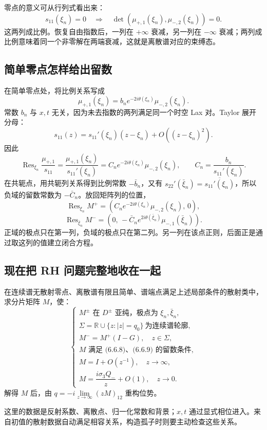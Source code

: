 \documentclass[lang=cn,scheme=chinese,mode=simple,device=normal,color=blue,math=cm,thmcnt=section,12pt]{elegantbook}
\DeclareMathOperator*{\Res}{Res}
\newcommand{\eqq}[2]{\tag{#1}\label{eq:#1}#2}
\begin{document}
零点的意义可从行列式看出来：
\[
s_{11}(\xi_n)=0
\quad\Longrightarrow\quad
\det(\mu_{+,1}(\xi_n),\mu_{-,2}(\xi_n))=0.
\]
这两列成比例。恢复自由指数后，一列在 $+\infty$ 衰减，另一列在 $-\infty$ 衰减；两列成比例意味着同一个非零解在两端衰减，这就是离散谱对应的束缚态。

\subsection*{简单零点怎样给出留数}
在简单零点处，将比例关系写成
\begin{equation}\eqq{6.6.2}{\mu_{+,1}(\xi_n)
=b_ne^{-2i\theta(\xi_n)}\mu_{-,2}(\xi_n).}\end{equation}
常数 $b_n$ 与 $x,t$ 无关，因为未去指数的两列满足同一个时空 Lax 对。Taylor 展开分母：
\[
s_{11}(z)=s_{11}'(\xi_n)(z-\xi_n)+O((z-\xi_n)^2).
\]
因此
\begin{equation}\eqq{6.6.3}{\Res_{\xi_n}\dfrac{\mu_{+,1}}{s_{11}}
=\dfrac{\mu_{+,1}(\xi_n)}{s_{11}'(\xi_n)}
=C_ne^{-2i\theta(\xi_n)}\mu_{-,2}(\xi_n),
\qquad C_n=\dfrac{b_n}{s_{11}'(\xi_n)}.}\end{equation}
在共轭点，用共轭列关系得到比例常数 $-\bar b_n$，又有
$s_{22}'(\bar\xi_n)=\overline{s_{11}'(\xi_n)}$，所以负域的留数常数为 $-\bar C_n$。放回矩阵列的位置，
\begin{equation}\eqq{6.6.8}{\Res_{\xi_n}M^+
=\left(C_ne^{-2i\theta(\xi_n)}\mu_{-,2}(\xi_n),\,0\right),}\end{equation}
\begin{equation}\eqq{6.6.9}{\Res_{\bar\xi_n}M^-
=\left(0,\,-\bar C_ne^{2i\theta(\bar\xi_n)}\mu_{-,1}(\bar\xi_n)\right).}\end{equation}
正域的极点只在第一列，负域的极点只在第二列。另一列在该点正则，后面正是通过取这列的值建立闭合方程。

\subsection*{现在把 RH 问题完整地收在一起}
\setcounter{theorem}{2}
\begin{theorem}[简单极点的 RH 问题]
在连续谱无散射零点、离散谱有限且简单、谱端点满足上述局部条件的散射类中，求分片矩阵 $M$，使：
\[
\begin{cases}
M^\pm \text{ 在 }D^\pm\text{ 亚纯，极点为 }\xi_n,\bar\xi_n,\\
\Sigma=\mathbb R\cup\{z:|z|=q_0\}\ \text{为连续谱轮廓},\\
M^-=M^+(I-G),\quad z\in\Sigma,\\
M \text{ 满足 (6.6.8)、(6.6.9) 的留数条件},\\
M=I+O(z^{-1}),\quad z\to\infty,\\
M=\dfrac{i\sigma_3Q_-}{z}+O(1),\quad z\to0.
\end{cases}
\]
解得 $M$ 后，由 $q=-i\displaystyle\lim\limits_{z\to\infty}(zM)_{12}$ 重构位势。
\end{theorem}
这里的数据是反射系数、离散点、归一化常数和背景；$x,t$ 通过显式相位进入。来自初值的散射数据自动满足相容关系，构造孤子时则要主动检查这些关系。
\end{document}
